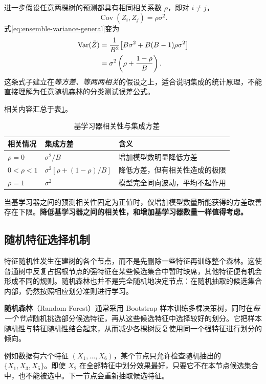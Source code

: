 进一步假设任意两棵树的预测都具有相同相关系数 $\rho$，即对 $i\ne j$，
\[
\operatorname{Cov}(Z_i,Z_j)=\rho\sigma^2.
\]
式\eqref{eq:ensemble-variance-general}变为
\begin{align}
\operatorname{Var}(\bar Z)
&=\frac1{B^2}\big[B\sigma^2+B(B-1)\rho\sigma^2\big]\notag\\
&=\sigma^2\left(\rho+\frac{1-\rho}{B}\right).
\label{eq:ensemble-correlation}
\end{align}
这条式子建立在\emph{等方差、等两两相关}的假设之上，适合说明集成的统计原理，不能直接理解为任意随机森林的分类测试误差公式。

相关内容汇总于表\ref{tab:ensemble-variance}。
\begin{table}[htbp]\centering
\caption{基学习器相关性与集成方差}\label{tab:ensemble-variance}
\begin{tabular}{p{28mm}p{50mm}p{60mm}}\toprule
相关情况&集成方差&含义\\\midrule
$\rho=0$&$\sigma^2/B$&增加模型数明显降低方差\\
$0<\rho<1$&$\sigma^2[\rho+(1-\rho)/B]$&降低方差，但有相关性造成的极限\\
$\rho=1$&$\sigma^2$&模型完全同向波动，平均不起作用\\\bottomrule
\end{tabular}
\end{table}

当基学习器之间的预测相关性固定为正值时，仅增加模型数量所能获得的方差改善存在下限。\textbf{降低基学习器之间的相关性，和增加基学习器数量一样值得考虑。}

\subsection{随机特征选择机制}

特征随机性发生在建树的各个节点，而不是先删除一些特征再训练整个森林。这使普通树中反复占据根节点的强特征在某些候选集合中暂时缺席，其他特征便有机会形成不同的规则。随机森林也并不是完全随机地决定节点：在随机抽取的候选集合内部，仍然按照相应划分准则进行学习。

\textbf{随机森林}（Random Forest）通常采用 Bootstrap 样本训练多棵决策树，同时在\emph{每一个节点}随机挑选部分候选特征，再从这些候选特征中选择较好的划分。它把样本随机性与特征随机性结合起来，从而减少各棵树反复使用同一个强特征进行划分的倾向。

例如数据有六个特征 $(X_1,\ldots,X_6)$，某个节点只允许检查随机抽出的 $\{X_1,X_3,X_5\}$。即使 $X_2$ 在全部特征中划分效果最好，只要它不在本节点候选集合中，也不能被选中。下一节点会重新抽取候选特征。

